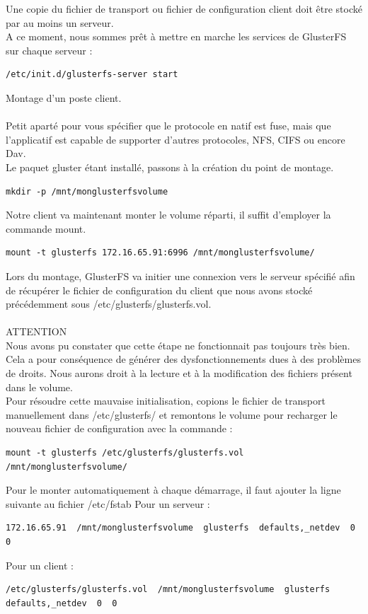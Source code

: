 \documentclass[12pt]{report}
\begin{document}
Une copie du fichier de transport ou fichier de configuration client doit être stocké par au moins un serveur.\\
A ce moment, nous sommes prêt à mettre en marche les services de GlusterFS sur chaque serveur :
\begin{lstlisting}
/etc/init.d/glusterfs-server start
	  \end{lstlisting}
Montage d'un poste client.\\\\
Petit aparté pour vous spécifier que le protocole en natif est fuse, mais que l'applicatif est capable de supporter d'autres protocoles, NFS, CIFS ou encore Dav.\\
Le paquet gluster étant installé, passons à la création du point de montage.
\begin{lstlisting}
mkdir -p /mnt/monglusterfsvolume
	  \end{lstlisting}
Notre client va maintenant monter le volume réparti, il suffit d'employer la commande mount.
\begin{lstlisting}
mount -t glusterfs 172.16.65.91:6996 /mnt/monglusterfsvolume/
	  \end{lstlisting}
Lors du montage, GlusterFS va initier une connexion vers le serveur spécifié afin de récupérer le fichier de configuration du client que nous avons stocké précédemment sous /etc/glusterfs/glusterfs.vol.\\\\
ATTENTION\\
Nous avons pu constater que cette étape ne fonctionnait pas toujours très bien. Cela a pour conséquence de générer des dysfonctionnements dues à des problèmes de droits. Nous aurons droit à la lecture et à la modification des fichiers présent dans le volume.\\
Pour résoudre cette mauvaise initialisation, copions le fichier de transport manuellement dans /etc/glusterfs/ et remontons le volume pour recharger le nouveau fichier de configuration avec la commande :
\begin{lstlisting}
mount -t glusterfs /etc/glusterfs/glusterfs.vol /mnt/monglusterfsvolume/
	  \end{lstlisting}
Pour le monter automatiquement à chaque démarrage, il faut ajouter la ligne suivante au fichier /etc/fstab
Pour un serveur :
\begin{lstlisting}
172.16.65.91  /mnt/monglusterfsvolume  glusterfs  defaults,_netdev  0  0
	  \end{lstlisting}
Pour un client :
\begin{lstlisting}
/etc/glusterfs/glusterfs.vol  /mnt/monglusterfsvolume  glusterfs  defaults,_netdev  0  0
	  \end{lstlisting}
\end{document}
